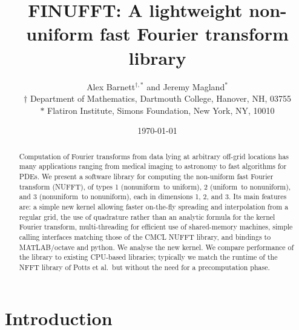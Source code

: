 \documentclass[10pt]{article}
\newcommand{\NU}{{nonuniform}}       %
\newcommand{\U}{{uniform}}
\begin{document}
\title{FINUFFT: A lightweight non-uniform fast Fourier transform library}
\author{Alex Barnett$^{\dag,\ast}$ and Jeremy Magland$^\ast$\\
  $\dag$ Department of Mathematics, Dartmouth College,
    Hanover, NH, 03755 \\
    $\ast$ Flatiron Institute, Simons Foundation,
    New York, NY, 10010
    }
\date{\today}
\maketitle
\begin{abstract}
  Computation of Fourier transforms from data lying at arbitrary
  off-grid locations has many applications ranging from medical
  imaging to astronomy to fast algorithms for PDEs.  We present a
  software library for computing the non-uniform fast Fourier transform
  (NUFFT),
  of types 1 (\NU\ to \U), 2 (\U\ to \NU), and
  3 (\NU\ to \NU), each in dimensions 1, 2, and 3.  Its
  main features are: a simple new kernel allowing faster on-the-fly
  spreading and interpolation from a regular grid, the use of
  quadrature rather than an analytic formula for the kernel Fourier
  transform, multi-threading for efficient use of shared-memory
  machines, simple calling interfaces matching those of the CMCL
  NUFFT library, and bindings to MATLAB/octave and python.
  We analyse the new kernel.
  We
  compare performance of the library to existing CPU-based libraries; typically
  we match the runtime of the NFFT library of Potts et al.\ but
  without the need for a precomputation phase.
\end{abstract}




\section{Introduction}
\end{document}
